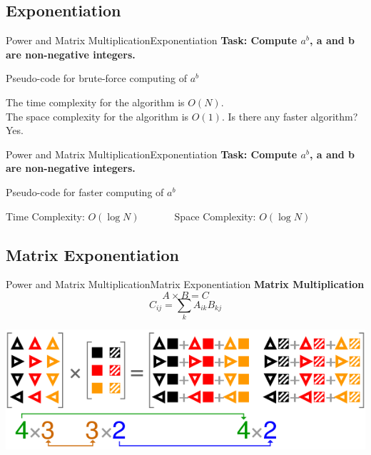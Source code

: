 \documentclass[mathserif,10pt]{beamer}
\begin{document}
\subsection{Exponentiation}
\begin{frame}{Power and Matrix Multiplication}{Exponentiation}
\textbf{\large Task: Compute $a ^ b$, a and b are non-negative integers.}
\begin{algorithm}[H]
\begin{algorithmic}[1]
\ENDFOR
\end{algorithmic}
\caption*{Pseudo-code for brute-force computing of $a^b$}
\end{algorithm}
\pause
The time complexity for the algorithm is $O(N)$. \\
The space complexity for the algorithm is $O(1)$.
\pause
Is there any faster algorithm? Yes.
\end{frame}


\begin{frame}{Power and Matrix Multiplication}{Exponentiation}
\textbf{\large Task: Compute $a ^ b$, a and b are non-negative integers.}
\begin{algorithm}[H]
\begin{algorithmic}[1]
\ELSE
	\ENDIF
\ENDIF
\end{algorithmic}
\caption*{Pseudo-code for faster computing of $a^b$}
\end{algorithm}
\pause
Time Complexity: $O(\log N)$~~~~~~~Space Complexity: $O(\log N)$
\end{frame}

\subsection{Matrix Exponentiation}
\begin{frame}{Power and Matrix Multiplication}{Matrix Exponentiation}
\textbf{\large Matrix Multiplication}
$$A \times B = C $$
$$C_{ij} = \sum_k A_{ik} B_{kj}$$
\begin{center}
\pause
\includegraphics[width=0.8\linewidth]{Images/matrix}
\end{center}
\end{frame}
\end{document}
